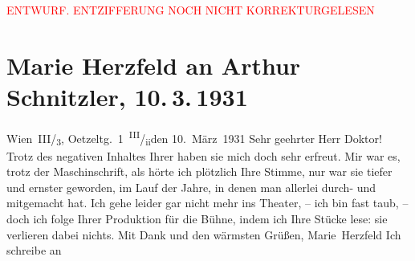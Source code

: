 
\begin{center}
            \textcolor{red}{ENTWURF. ENTZIFFERUNG NOCH NICHT KORREKTURGELESEN}
                      \end{center}
            
               \section[Marie Herzfeld an Arthur Schnitzler, 10. 3. 1931]{ Marie Herzfeld an Arthur Schnitzler, 10. 3. 1931}\nopagebreak{}\rehead{ }\begin{ledgroupsized}[t]{13cm}\normalsize\beginnumbering{} \toendnotes[C]{\smallbreak\pagebreak[2]} 
\toendnotes[C]{\smallbreak}\pstart
           \raggedleft{}{\pb}Wien III/\textsubscript{3}, Oetzeltg. 1 \textsuperscript{III}/\textsubscript{ii}den 10. März 1931\pend
           \pstart\center{}Sehr geehrter Herr Doktor!\pend\pstart
           Trotz des negativen Inhaltes Ihrer \label{K_L02595-1v}\label{K_L02595-1h}haben sie mich doch sehr erfreut. Mir war
               es, trotz der Maschinschrift, als hörte ich plötzlich Ihre Stimme, nur war sie
               tiefer und ernster geworden, im Lauf der Jahre, in denen man {\pb}allerlei durch- und mitgemacht hat.\pend
           \pstart
           Ich gehe leider gar nicht mehr ins Theater, – ich bin fast taub, – doch ich folge
               Ihrer Produktion für die Bühne, indem ich Ihre Stücke lese: sie verlieren dabei
               nichts. Mit Dank und den wärmsten Grüßen,\pend
           \pstart \spacefill\mbox{Marie Herzfeld}\pend{}\pstart
           \noindent{}\label{K_L02595-2v}\label{K_L02595-2h} Ich schreibe an

\end{ledgroupsized}
